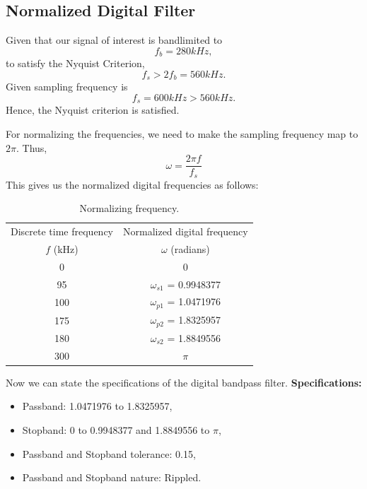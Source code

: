 \documentclass[12pt]{article}
\begin{document}
\subsection{Normalized Digital Filter}
Given that our signal of interest is bandlimited to
\[f_b = 280 kHz,\]
to satisfy the Nyquist Criterion,
\[f_s > 2 f_b = 560 kHz.\]
Given sampling frequency is
\[f_s = 600 kHz > 560 kHz.\]
Hence, the Nyquist criterion is satisfied.

For normalizing the frequencies, we need to make the sampling frequency map to $2\pi$. Thus,
\[\omega = \frac{2\pi f}{f_s}\]
This gives us the normalized digital frequencies as follows:
\begin{table}[h]
    \centering
    \begin{tabular}{|c|c|}\hline
         Discrete time frequency&Normalized digital frequency\\
         $f$ (kHz)&$\omega$ (radians)\\\hline
         0&0\\\hline
         95&$\omega_{s1}$ = 0.9948377\\\hline
         100&$\omega_{p1}$ = 1.0471976\\\hline
         175&$\omega_{p2}$ = 1.8325957\\\hline
         180&$\omega_{s2}$ = 1.8849556\\\hline
         300&$\pi$\\\hline
    \end{tabular}
    \caption{Normalizing frequency.}
    \label{tab:1}
\end{table}

Now we can state the specifications of the digital bandpass filter.
\newline
\hline
\vspace{10pt}
\textbf{Specifications:}
\begin{itemize}
    \item Passband: 1.0471976 to 1.8325957,
    \item Stopband: 0 to 0.9948377 and 1.8849556 to  $\pi$,
    \item Passband and Stopband tolerance: 0.15,
    \item Passband and Stopband nature: Rippled.
\end{itemize}
\hline
\end{document}
